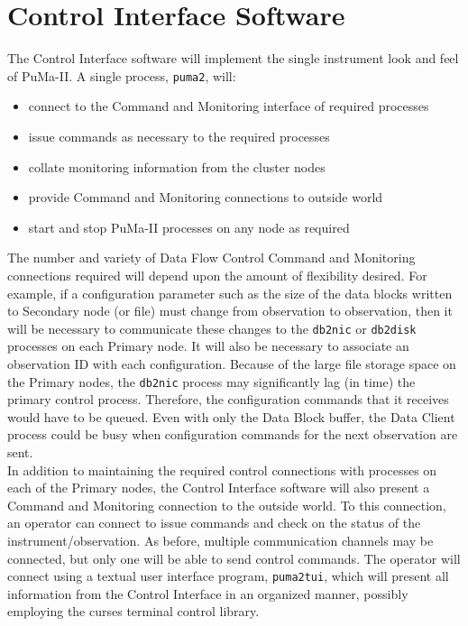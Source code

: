 \chapter{Control Interface Software}

The Control Interface software will implement the single instrument
look and feel of PuMa-II.  A single process, {\tt puma2}, will:

\begin{itemize}
\item connect to the Command and Monitoring interface of required processes
\item issue commands as necessary to the required processes
\item collate monitoring information from the cluster nodes
\item provide Command and Monitoring connections to outside world
\item start and stop PuMa-II processes on any node as required
\end{itemize}

The number and variety of Data Flow Control Command and Monitoring
connections required will depend upon the amount of flexibility
desired. For example, if a configuration parameter such as the size of
the data blocks written to Secondary node (or file) must change from
observation to observation, then it will be necessary to communicate
these changes to the {\tt db2nic} or {\tt db2disk} processes on each
Primary node.  It will also be necessary to associate an observation
ID with each configuration.  Because of the large file storage space
on the Primary nodes, the {\tt db2nic} process may significantly lag
(in time) the primary control process.  Therefore, the configuration
commands that it receives would have to be queued.  Even with only the
Data Block buffer, the Data Client process could be busy when
configuration commands for the next observation are sent. \\

In addition to maintaining the required control connections with
processes on each of the Primary nodes, the Control Interface software
will also present a Command and Monitoring connection to the outside
world.  To this connection, an operator can connect to issue commands
and check on the status of the instrument/observation.  As before,
multiple communication channels may be connected, but only one will be
able to send control commands.  The operator will connect using a
textual user interface program, {\tt puma2tui}, which will present all
information from the Control Interface in an organized manner,
possibly employing the curses terminal control library.

